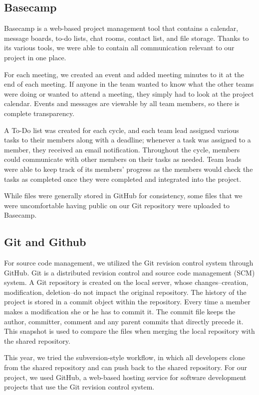 \documentclass[12pt, letterpaper]{article}
\begin{document}
\subsection{Basecamp}
Basecamp is a web-based project management tool that contains a calendar, message boards, to-do lists, chat rooms, contact list, and file storage. Thanks to its various tools, we were able to contain all communication relevant to our project in one place.

For each meeting, we created an event and added meeting minutes to it at the end of each meeting. If anyone in the team wanted to know what the other teams were doing or wanted to attend a meeting, they simply had to look at the project calendar. Events and messages are viewable by all team members, so there is complete transparency.

A To-Do list was created for each cycle, and each team lead assigned various tasks to their members along with a deadline; whenever a task was assigned to a member, they received an email notification.  Throughout the cycle, members could communicate with other members on their tasks as needed. Team leads were able to keep track of its members’ progress as the members would check the tasks as completed once they were completed and integrated into the project.

While files were generally stored in GitHub for consistency, some files that we were uncomfortable having public on our Git repository were uploaded to Basecamp.

\subsection{Git and Github}
For source code management, we utilized the Git revision control system through GitHub. Git is a distributed revision control and source code management (SCM) system. A Git repository is created on the local server, whose changes--creation, modification, deletion--do not impact the original repository.   The history of the project is stored in a commit object within the repository. Every time a member makes a modification she or he has to commit it. The commit file keeps the author, committer, comment and any parent commits that directly precede it. This snapshot is used to compare the files when merging the local repository with the shared repository.

This year, we tried the subversion-style workflow, in which all developers clone from the shared repository and can push back to the shared repository. For our project, we used GitHub, a web-based hosting service for software development projects that use the Git revision control system.
\end{document}
